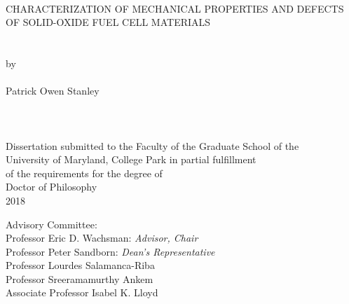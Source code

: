 
\thispagestyle{empty}
\hbox{\ }
\vspace{1in}
\renewcommand{\baselinestretch}{1}
\small\normalsize
\begin{center}

\large{{CHARACTERIZATION OF MECHANICAL PROPERTIES AND DEFECTS OF SOLID-OXIDE FUEL CELL MATERIALS}}\\
\ \\
\ \\
\large{by} \\
\ \\
\large{Patrick Owen Stanley}%
\ \\
\ \\
\ \\
\ \\
\normalsize
Dissertation submitted to the Faculty of the Graduate School of the \\
University of Maryland, College Park in partial fulfillment \\
of the requirements for the degree of \\
Doctor of Philosophy \\
2018
\end{center}

\vspace{7.5em}

\noindent Advisory Committee: \\
Professor Eric D. Wachsman: \textit{Advisor, Chair} \\
Professor Peter Sandborn: \textit{Dean's Representative} \\
Professor Lourdes Salamanca-Riba \\
Professor Sreeramamurthy Ankem \\
Associate Professor Isabel K. Lloyd
